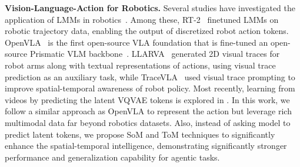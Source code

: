 \noindent\textbf{Vision-Language-Action for Robotics.} Several studies have investigated the application of LMMs in robotics~\citep{brohan2023rt,niu2024llarva,zhu2024vision,li2024llara,kim2024openvla,zheng2024tracevla,ye2024latent}. 
Among these, RT-2~\citep{brohan2023rt} finetuned LMMs on robotic trajectory data, enabling the output of discretized robot action tokens. OpenVLA~\citep{kim2024openvla} is the first open-source VLA foundation that is fine-tuned an open-source Prismatic VLM backbone~\citep{karamcheti2024prismatic}.
LLARVA~\citep{niu2024llarva} generated 2D visual traces for robot arms along with textual representations of actions, using visual trace prediction as an auxiliary task, while TraceVLA~\cite{zheng2024tracevla} used visual trace prompting to improve spatial-temporal awareness of robot policy. Most recently, learning from videos by predicting the latent VQVAE tokens is explored in \cite{cheang2024gr2generativevideolanguageactionmodel,ye2024latentactionpretrainingvideos}. In this work, we follow a similar approach as OpenVLA to represent the action but leverage rich multimodal data far beyond robotics datasets. Also, instead of asking model to predict latent tokens, we propose SoM and ToM techniques to significantly enhance the spatial-temporal intelligence, demonstrating significantly stronger performance and generalization capability for agentic tasks.